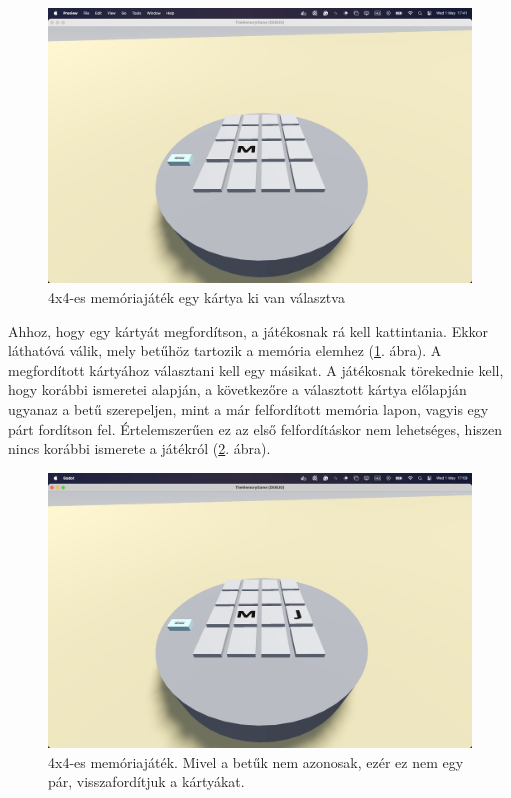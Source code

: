 \begin{figure}
    \includegraphics[width=\textwidth]{img/asztal_4x4_card_flipped.png}
    \caption{4x4-es memóriajáték egy kártya ki van választva}
    \label{img:kartya_fliped}
\end{figure}
Ahhoz, hogy egy kártyát megfordítson, a játékosnak rá kell kattintania. Ekkor láthatóvá válik, mely betűhöz tartozik a memória elemhez (\ref{img:kartya_fliped}. ábra). 
A megfordított kártyához választani kell egy másikat. A játékosnak törekednie kell, hogy korábbi ismeretei alapján, a következőre a választott kártya előlapján ugyanaz a betű szerepeljen, mint a már felfordított memória lapon, vagyis egy párt fordítson fel. 
Értelemszerűen ez az első felfordításkor nem lehetséges, hiszen nincs korábbi ismerete a játékról (\ref{img:non_pair}. ábra).
\begin{figure}
    \includegraphics[width=\textwidth]{img/asztal_4x4_non_pair.png}
    \caption{4x4-es memóriajáték. Mivel a betűk nem azonosak, ezér ez nem egy pár, visszafordítjuk a kártyákat.}
    \label{img:non_pair}
\end{figure}

